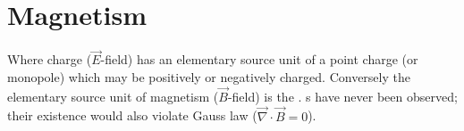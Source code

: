 \section{Magnetism}
Where charge ($\vec{E}$-field) has an elementary source unit of a point charge (or monopole) which may be positively or negatively charged. Conversely the elementary source unit of magnetism ($\vec{B}$-field) is the . s have never been observed; their existence would also violate Gauss law ($\vec{\nabla} \cdot \vec{B} = 0 $). 




